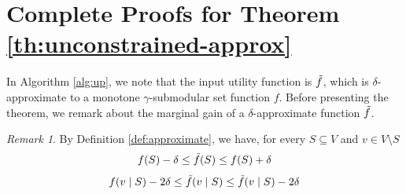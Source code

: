 \documentclass[10pt]{article} %
\newtheorem{definition}{Definition}
\theoremstyle{remark}
\newtheorem{remark}[theorem]{Remark}
\begin{document}



\section{Complete Proofs for Theorem \ref{th:unconstrained-approx}}
\label{sec:unconstrained-approx}


In Algorithm \ref{alg:up}, we note that the input utility function is $\Tilde{f}$, which is $\delta$-approximate to a monotone $\gamma$-submodular set function $f$. Before presenting the theorem, we remark about the marginal gain of a $\delta$-approximate function $\Tilde{f}$.

\begin{remark}
By Definition \ref{def:approximate}, we have, for every $S \subseteq V$ and $v \in V \setminus S$
    \[ f(S) - \delta \leq \Tilde{f}(S) \leq f(S) + \delta\]
    \[ f(v \mid S) - 2\delta \leq \Tilde{f}(v \mid S) \leq \Tilde{f}(v \mid S) - 2\delta \]
\end{remark}

\end{document}
